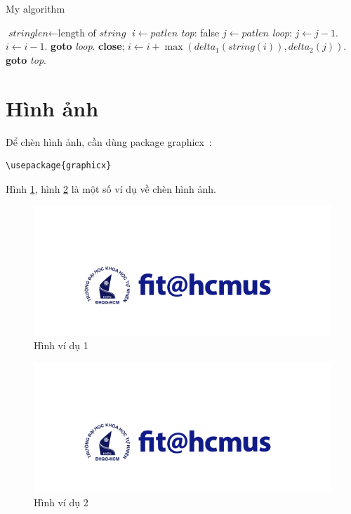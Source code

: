 \begin{algorithm}
\caption{My algorithm}\label{euclid}
\begin{algorithmic}[1]
\State $\textit{stringlen} \gets \text{length of }\textit{string}$
\State $i \gets \textit{patlen}$
\BState \emph{top}:
 \Return false
\EndIf
\State $j \gets \textit{patlen}$
\BState \emph{loop}:
\State $j \gets j-1$.
\State $i \gets i-1$.
\State \textbf{goto} \emph{loop}.
\State \textbf{close};
\EndIf
\State $i \gets i+\max(\textit{delta}_1(\textit{string}(i)),\textit{delta}_2(j))$.
\State \textbf{goto} \emph{top}.
\EndProcedure
\end{algorithmic}
\end{algorithm}

\section{Hình ảnh}

Để chèn hình ảnh, cần dùng package graphicx~\cite{Figures}:

\begin{lstlisting}
\usepackage{graphicx}
\end{lstlisting}

Hình \ref{fig:vd1}, hình \ref{fig:vd2} là một số ví dụ về chèn hình ảnh.

\begin{figure}[htp]
\centering
\includegraphics[width=9 cm]{images/logo.png}
\caption{Hình ví dụ 1}
\label{fig:vd1}
\end{figure}

\begin{figure}[htp]
\centering
\includegraphics[width=60 mm]{images/logo.png}
\caption{Hình ví dụ 2}
\label{fig:vd2}
\end{figure}

